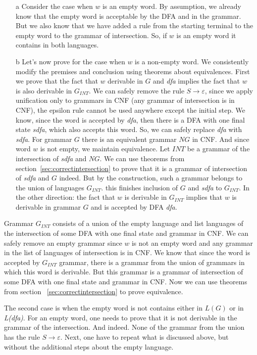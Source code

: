 \begin{enumerate}
\item[a] Consider the case when $w$ is an empty word.
By assumption, we already know that the empty word is acceptable by the DFA and in the grammar. But we also know that we have added a rule from the starting terminal to the empty word to the grammar of intersection. So, if $w$ is an empty word it contains in both languages.
\item[b] Let's now prove for the case when $w$ is a non-empty word.
We consistently modify the premises and conclusion using theorems about equivalences. First we prove that the fact that $w$ derivable in $G$ and \textit{dfa} implies the fact that $w$ is also derivable in $G_{INT}$. We can safely remove the rule $S \to \varepsilon$, since we apply unification only to grammars in CNF (any grammar of intersection is in CNF), the epsilon rule cannot be used anywhere except the initial step.
We know, since the word is accepted by \textit{dfa}, then there is a DFA with one final state \textit{sdfa}, which also accepts this word. So, we can safely replace \textit{dfa} with \textit{sdfa}. 
For grammar $G$ there is an equivalent grammar $NG$ in CNF. And since word $w$ is not empty, we maintain equivalence.
Let $INT$ be a grammar of the intersection of \textit{sdfa} and $NG$. We can use theorems from section~\ref{sec:correctintersection} to prove that it is a grammar of intersection of \textit{sdfa} and $G$ indeed. 
But by the construction, such a grammar belongs to the union of languages $G_{INT}$. this finishes inclusion of $G$ and \textit{sdfa} to $G_{INT}$.
In the other direction: the fact that $w$ is derivable in $G_{INT}$ implies that $w$ is derivable in grammar $G$ and is accepted by DFA \textit{dfa}. 
\end{enumerate}

Grammar $G_{INT}$ consists of a union of the empty language and list languages of the intersection of some DFA with one final state and grammar in CNF. We can safely remove an empty grammar since $w$ is not an empty word and any grammar in the list of languages of intersection is in CNF.
We know that since the word is accepted by $G_{INT}$ grammar, there is a grammar from the union of grammars in which this word is derivable.
But this grammar is a grammar of intersection of some DFA with one final state and grammar in CNF. Now we can use theorems from section ~\ref{sec:correctintersection} to prove equivalence.

The second case is when the empty word is not contains either in $L(G)$ or in \textit{L(dfa)}.
For an empty word, one needs to prove that it is not derivable in the grammar of the intersection. 
And indeed. None of the grammar from the union has the rule $S \to \varepsilon$. 
Next, one have to repeat what is discussed above, but without the additional steps about the empty language.
